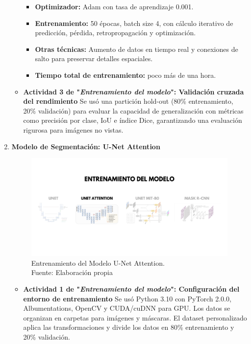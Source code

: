 \begin{enumerate}
\begin{itemize}
\begin{itemize}
\item \textbf{Optimizador:} Adam con tasa de aprendizaje 0.001.

\item \textbf{Entrenamiento:} 50 épocas, batch size 4, con cálculo iterativo de predicción, pérdida, retropropagación y optimización.

\item \textbf{Otras técnicas:} Aumento de datos en tiempo real y conexiones de salto para preservar detalles espaciales.

\item \textbf{Tiempo total de entrenamiento:} poco más de una hora.

  \end{itemize}
  


  \item\textbf{Actividad 3 de "\textit{Entrenamiento del modelo}": Validación cruzada del rendimiento}
  Se usó una partición hold-out (80\% entrenamiento, 20\% validación) para evaluar la capacidad de generalización con métricas como precisión por clase, IoU e índice Dice, garantizando una evaluación rigurosa para imágenes no vistas.

  \end{itemize}
\newpage
  \item \textbf{Modelo de Segmentación: U-Net Attention}
  \begin{figure}[H]
	\begin{center}
		\includegraphics[width=1\textwidth]{4/figures/entrunetat.png}
		\caption[Entrenamiento del Modelo U-Net Attention]{Entrenamiento del Modelo U-Net Attention.\\
		Fuente: Elaboración propia}
		\label{4:figentunetat}
	\end{center}
\end{figure}
  \begin{itemize}
  \item\textbf{Actividad 1 de "\textit{Entrenamiento del modelo}": Configuración del entorno de entrenamiento}
  Se usó Python 3.10 con PyTorch 2.0.0, Albumentations, OpenCV y CUDA/cuDNN para GPU. Los datos se organizan en carpetas para imágenes y máscaras. El dataset personalizado aplica las transformaciones y divide los datos en 80\% entrenamiento y 20\% validación.


\end{itemize}
\end{enumerate}
